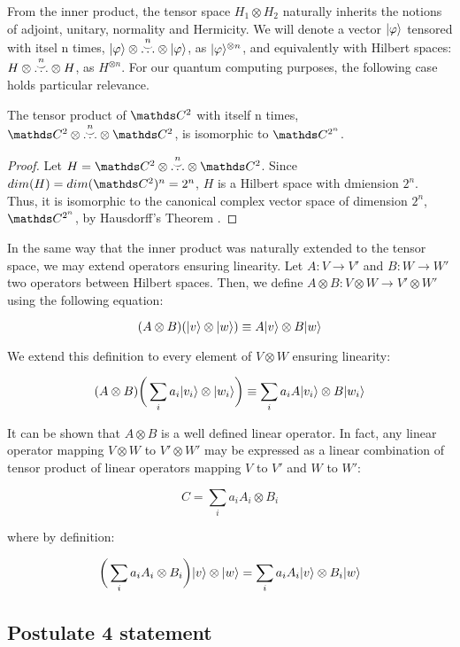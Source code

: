From the inner product, the tensor space $H_1 \otimes H_2$ naturally inherits the notions of adjoint, unitary, normality and Hermicity. We will denote a vector $|\varphi\rangle$ tensored with itsel n times, $|\varphi\rangle \otimes \overset{\substack{n\\\smile}}{\dotsc} \otimes |\varphi\rangle$, as $|\varphi\rangle^{\otimes n}$, and equivalently with Hilbert spaces: $H \otimes \overset{\substack{n\\\smile}}{\dotsc} \otimes H$, as $H^{\otimes n}$. For our quantum computing purposes, the following case holds particular relevance.

\begin{corollary}
	The tensor product of $\C^2$ with itself n times, $\C^2 \otimes \overplace{n}{\dotsc} \otimes \C^2$, is isomorphic to $\C^{2^n}$.
\end{corollary}

\begin{proof}
	Let $H = \C^2 \otimes \overplace{n}{\dotsc} \otimes \C^2$. Since $dim(H) = dim(\C^2)^n = 2^n$, $H$ is a Hilbert space with dmiension $2^n$. Thus, it is isomorphic to the canonical complex vector space of dimension $2^n$, $\C^{2^n}$, by Hausdorff's Theorem \cite{Paya2020}.
\end{proof}

In the same way that the inner product was naturally extended to the tensor space, we may extend operators ensuring linearity. Let $A: V \longrightarrow V'$ and $B: W \longrightarrow W'$ two operators between Hilbert spaces. Then, we define $A \otimes B: V \otimes W \longrightarrow V' \otimes W'$ using the following equation:

$$ (A \otimes B)(|v\rangle \otimes |w\rangle) \equiv A|v\rangle \otimes B|w\rangle $$

We extend this definition to every element of $V \otimes W$ ensuring linearity:

$$ (A \otimes B) \bigg(\sum_i a_i |v_i\rangle \otimes |w_i\rangle \bigg) \equiv \sum_i a_i A|v_i\rangle \otimes B|w_i\rangle $$

It can be shown that $A \otimes B$ is a well defined linear operator. In fact, any linear operator mapping $V \otimes W$ to $V' \otimes W'$ may be expressed as a linear combination of tensor product of linear operators mapping $V$ to $V'$ and $W$ to $W'$:

$$ C = \sum_i a_i A_i \otimes B_i $$

where by definition:

$$ \bigg( \sum_i a_i A_i \otimes B_i \bigg)|v\rangle \otimes |w\rangle = \sum_i a_i A_i|v\rangle \otimes B_i|w\rangle $$

\subsection{Postulate 4 statement}

